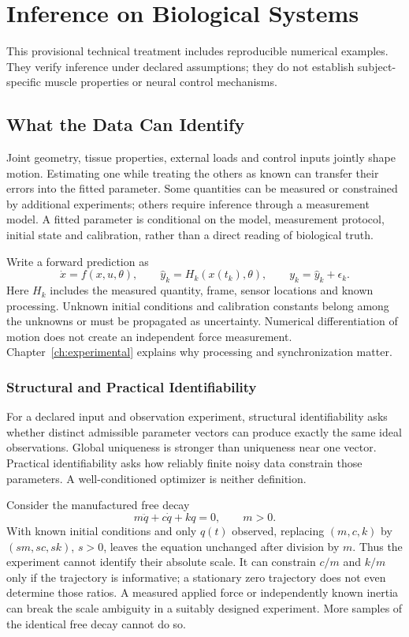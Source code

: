 \chapter{Inference on Biological Systems}
\label{ch:inference}
\begin{gomdraftnotice}
This provisional technical treatment includes reproducible numerical examples.
They verify inference under declared assumptions; they do not establish
subject-specific muscle properties or neural control mechanisms.
\end{gomdraftnotice}

\section{What the Data Can Identify}
Joint geometry, tissue properties, external loads and control inputs jointly shape
motion. Estimating one while treating the others as known can transfer their errors
into the fitted parameter. Some quantities can be measured or constrained by
additional experiments; others require inference through a measurement model.
A fitted parameter is conditional on the model, measurement protocol, initial state
and calibration, rather than a direct reading of biological truth.

Write a forward prediction as
\begin{equation}
 \dot x=f(x,u,\theta),\qquad
 \hat y_k=H_k(x(t_k),\theta),\qquad y_k=\hat y_k+\epsilon_k.
\end{equation}
Here $H_k$ includes the measured quantity, frame, sensor locations and known
processing. Unknown initial conditions and calibration constants belong among the
unknowns or must be propagated as uncertainty. Numerical differentiation of motion
does not create an independent force measurement.
Chapter~\ref{ch:experimental} explains why processing and synchronization matter.

\subsection{Structural and Practical Identifiability}
For a declared input and observation experiment, structural identifiability asks
whether distinct admissible parameter vectors can produce exactly the same ideal
observations. Global uniqueness is stronger than uniqueness near one vector.
Practical identifiability asks how reliably finite noisy data constrain those
parameters. A well-conditioned optimizer is neither definition.

Consider the manufactured free decay
\begin{equation}
 m\ddot q+c\dot q+kq=0,\qquad m>0.
\end{equation}
With known initial conditions and only $q(t)$ observed, replacing $(m,c,k)$ by
$(sm,sc,sk)$, $s>0$, leaves the equation unchanged after division by $m$.
Thus the experiment cannot identify their absolute scale. It can constrain $c/m$
and $k/m$ only if the trajectory is informative; a stationary zero trajectory does
not even determine those ratios. A measured applied force or independently known
inertia can break the scale ambiguity in a suitably designed experiment.
More samples of the identical free decay cannot do so.

